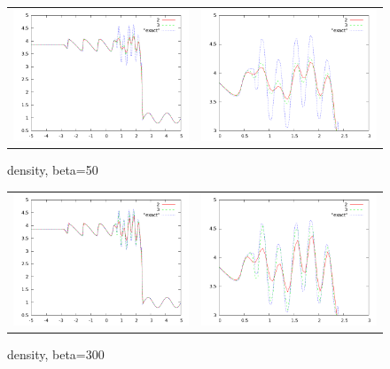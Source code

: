 \documentclass[letterpaper,12pt]{article}
\begin{document}
\begin{figure}
  \begin{center}
	\begin{tabular}{cc}
      \includegraphics[width=.425\textwidth]{50.png} &
	  \includegraphics[width=.425\textwidth]{50zoom.png}
	\end{tabular}
  \end{center}
  \caption{density, beta=50}
  \label{fig:pvcellcomp}
\end{figure}

\begin{figure}
  \begin{center}
	\begin{tabular}{cc}
      \includegraphics[width=.425\textwidth]{300.png} &
	  \includegraphics[width=.425\textwidth]{300zoom.png}
	\end{tabular}
  \end{center}
  \caption{density, beta=300}
  \label{fig:pvcellcomp}
\end{figure}



\end{document}
